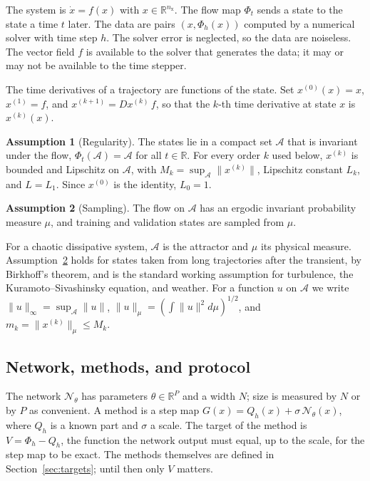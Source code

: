\documentclass[11pt]{article}
\theoremstyle{definition}
\newtheorem{assumption}{Assumption}
\theoremstyle{remark}
\newcommand{\R}{\mathbb{R}}
\newcommand{\Aset}{\mathcal{A}}
\newcommand{\Net}{\mathcal{N}_\theta}
\begin{document}
The system is $\dot x = f(x)$ with $x \in \R^{n_{\mathrm{x}}}$.
The flow map $\Phi_t$ sends a state to the state a time $t$ later.
The data are pairs $(x, \Phi_h(x))$ computed by a numerical solver with time step $h$.
The solver error is neglected, so the data are noiseless.
The vector field $f$ is available to the solver that generates the data; it may or may not be available to the time stepper.

The time derivatives of a trajectory are functions of the state.
Set $x^{(0)}(x) = x$, $x^{(1)} = f$, and $x^{(k+1)} = Dx^{(k)}\,f$, so that the $k$-th time derivative at state $x$ is $x^{(k)}(x)$.

\begin{assumption}[Regularity]\label{ass:regular}
The states lie in a compact set $\Aset$ that is invariant under the flow, $\Phi_t(\Aset) = \Aset$ for all $t \in \R$.
For every order $k$ used below, $x^{(k)}$ is bounded and Lipschitz on $\Aset$, with $M_k = \sup_{\Aset}\|x^{(k)}\|$, Lipschitz constant $L_k$, and $L = L_1$.
Since $x^{(0)}$ is the identity, $L_0 = 1$.
\end{assumption}

\begin{assumption}[Sampling]\label{ass:sampling}
The flow on $\Aset$ has an ergodic invariant probability measure $\mu$, and training and validation states are sampled from $\mu$.
\end{assumption}

For a chaotic dissipative system, $\Aset$ is the attractor and $\mu$ its physical measure.
Assumption~\ref{ass:sampling} holds for states taken from long trajectories after the transient, by Birkhoff's theorem, and is the standard working assumption for turbulence, the Kuramoto--Sivashinsky equation, and weather.
For a function $u$ on $\Aset$ we write $\|u\|_\infty = \sup_\Aset\|u\|$, $\|u\|_\mu = (\int\|u\|^2d\mu)^{1/2}$, and $m_k = \|x^{(k)}\|_\mu \le M_k$.

\subsection{Network, methods, and protocol}

The network $\Net$ has parameters $\theta \in \R^P$ and a width $N$; size is measured by $N$ or by $P$ as convenient.
A method is a step map $G(x) = Q_h(x) + \sigma\,\Net(x)$, where $Q_h$ is a known part and $\sigma$ a scale.
The target of the method is $V = \Phi_h - Q_h$, the function the network output must equal, up to the scale, for the step map to be exact.
The methods themselves are defined in Section~\ref{sec:targets}; until then only $V$ matters.
\end{document}
